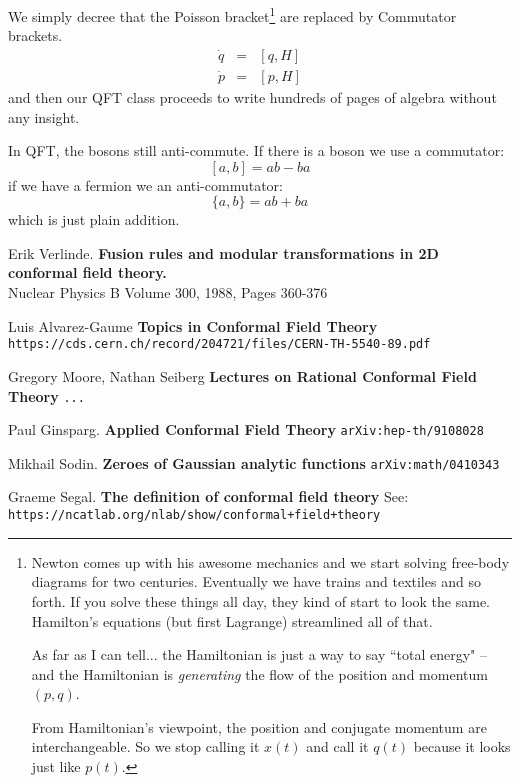 \documentclass[12pt]{article}
\begin{document}
 We simply decree that the Poisson bracket\footnote{Newton comes up with his awesome mechanics and we start solving free-body diagrams for two centuries.  Eventually we have trains and textiles and so forth.  If you solve these things all day, they kind of start to look the same.  Hamilton's equations (but first Lagrange) streamlined all of that.
 
As far as I can tell... the Hamiltonian is just a way to say ``total energy" -- and the Hamiltonian is \textit{generating} the flow of the position and momentum $(p,q)$.

From Hamiltonian's viewpoint, the position and conjugate momentum are interchangeable.  So we stop calling it $x(t)$ and call it $q(t)$ because it looks just like $p(t)$. } are replaced by Commutator brackets. 
\begin{eqnarray*} \dot{q} &=& [ q, H  ] \\  
\dot{p} &=&  [ p, H  ]  \end{eqnarray*}
and then our QFT class proceeds to write hundreds of pages of algebra without any insight.  \newpage

In QFT, the bosons still anti-commute.  If there is a boson we use a commutator:
$$ [a,b] = ab - ba $$
if we have a fermion we an anti-commutator:
$$ \{ a, b\} = ab + ba $$
which is just plain addition.
\newpage

\selectfont \fontsize{12}{10}\selectfont


\begin{thebibliography}{}

\item Erik Verlinde. \textbf{Fusion rules and modular transformations in 2D conformal field theory.} \\ Nuclear Physics B
Volume 300, 1988, Pages 360-376

\item Luis Alvarez-Gaume \textbf{Topics in Conformal Field Theory} \\ \texttt{https://cds.cern.ch/record/204721/files/CERN-TH-5540-89.pdf}

\item Gregory Moore, Nathan Seiberg \textbf{Lectures on Rational Conformal Field Theory} \texttt{...}

\item Paul Ginsparg.  \textbf{Applied Conformal Field Theory} \texttt{arXiv:hep-th/9108028}

\item Mikhail Sodin. \textbf{Zeroes of Gaussian analytic functions} \texttt{arXiv:math/0410343}

\item Graeme Segal. \textbf{The definition of conformal field theory} See: \texttt{https://ncatlab.org/nlab/show/conformal+field+theory}


\end{thebibliography}
\end{document}
